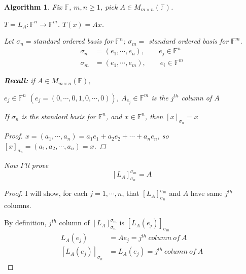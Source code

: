 \documentclass[12pt]{article}
\theoremstyle{plain}
\newtheorem{algorithm}{Algorithm}[subsection]
\newcommand{\mF}{{\mathbb{F}}}
\begin{document}
	\begin{algorithm}
		Fix $\mF$, $m,n \geq 1$, pick $A \in M_{m\times n}(\mF)$. 

		$T = L_A : \mF^n \to \mF^m$. $T(x) = Ax$. 

		Let $\sigma_n= $standard ordered basis for $\mF^n$; 
		$\sigma_m=$ standard ordered basis for $\mF^m$. 
		\begin{align*}
			\sigma_n &= (e_1, \cdots, e_n), \qquad e_j \in \mF^n \\
			\sigma_m &= (e_1,\cdots, e_m), \qquad e_i \in \mF^m 
		\end{align*}

		\textbf{Recall:} if $A \in M_{m\times n} (\mF)$, 
		
		$e_j \in \mF^n$ $(e_j = (0, \cdots, 0, 1, 0, \cdots, 0))$, 
		$A_{e_j} \in \mF^m$ is the $j^{th}$ column of $A$ 

		If $\sigma_n$ is the standard basis for $\mF^n$, and $x \in \mF^n$, 
		then $[x]_{\sigma_n} =x$
		\begin{proof}
			$x = (a_1,\cdots, a_n) = a_1e_1 + a_2e_2+\cdots+a_ne_n$,
			so $[x]_{\sigma_n} = (a_1,a_2,\cdots,a_n)=x$.
		\end{proof}

		Now I'll prove 
		\[
			[L_A]^{\sigma_m}_{\sigma_n} = A
		\]
	\end{algorithm}
	\begin{proof}
		I will show, for each $j = 1, \cdots, n$, that 
		$[L_A]^{\sigma_m}_{\sigma_n}$ and $A$ have same $j^{th}$ columns. 

		By definition, $j^{th}$ column of $[L_A]^{\sigma_m}_{\sigma_n}$ is 
		$[L_A(e_j)]_{\sigma_m}$
		\begin{align*}
			L_A(e_j) &= Ae_j=j^{th} \ column \ of \ A\\
			[L_A(e_j)]_{\sigma_n} &= L_A(e_j) = j^{th} \ column \ of \ A
		\end{align*}
	\end{proof}
\end{document}
